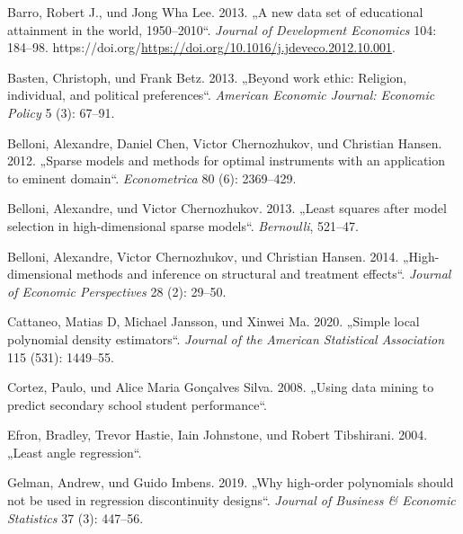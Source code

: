 \documentclass[
  a4paper,
  DIV=11,
  oneside]{scrreprt}
\newlength{\cslhangindent}
\newlength{\cslentryspacingunit} %
\newenvironment{CSLReferences}[2] %
 {%
  \setlength{\parindent}{0pt}
  \ifodd #1
  \let\oldpar\par
  \def\par{\hangindent=\cslhangindent\oldpar}
  \fi
  \setlength{\parskip}{#2\cslentryspacingunit}
 }%
 {}
\begin{document}
\hypertarget{refs}{}
\begin{CSLReferences}{1}{0}
\leavevmode{}%
Barro, Robert J., und Jong Wha Lee. 2013. {„A new data set of
educational attainment in the world, 1950--2010``}. \emph{Journal of
Development Economics} 104: 184--98.
https://doi.org/\url{https://doi.org/10.1016/j.jdeveco.2012.10.001}.

\leavevmode{}%
Basten, Christoph, und Frank Betz. 2013. {„Beyond work ethic: Religion,
individual, and political preferences``}. \emph{American Economic
Journal: Economic Policy} 5 (3): 67--91.

\leavevmode{}%
Belloni, Alexandre, Daniel Chen, Victor Chernozhukov, und Christian
Hansen. 2012. {„Sparse models and methods for optimal instruments with
an application to eminent domain``}. \emph{Econometrica} 80 (6):
2369--429.

\leavevmode{}%
Belloni, Alexandre, und Victor Chernozhukov. 2013. {„Least squares after
model selection in high-dimensional sparse models``}. \emph{Bernoulli},
521--47.

\leavevmode{}%
Belloni, Alexandre, Victor Chernozhukov, und Christian Hansen. 2014.
{„High-dimensional methods and inference on structural and treatment
effects``}. \emph{Journal of Economic Perspectives} 28 (2): 29--50.

\leavevmode{}%
Cattaneo, Matias D, Michael Jansson, und Xinwei Ma. 2020. {„Simple local
polynomial density estimators``}. \emph{Journal of the American
Statistical Association} 115 (531): 1449--55.

\leavevmode{}%
Cortez, Paulo, und Alice Maria Gonçalves Silva. 2008. {„Using data
mining to predict secondary school student performance``}.

\leavevmode{}%
Efron, Bradley, Trevor Hastie, Iain Johnstone, und Robert Tibshirani.
2004. {„Least angle regression``}.

\leavevmode{}%
Gelman, Andrew, und Guido Imbens. 2019. {„Why high-order polynomials
should not be used in regression discontinuity designs``}. \emph{Journal
of Business \& Economic Statistics} 37 (3): 447--56.


\end{CSLReferences}
\end{document}
